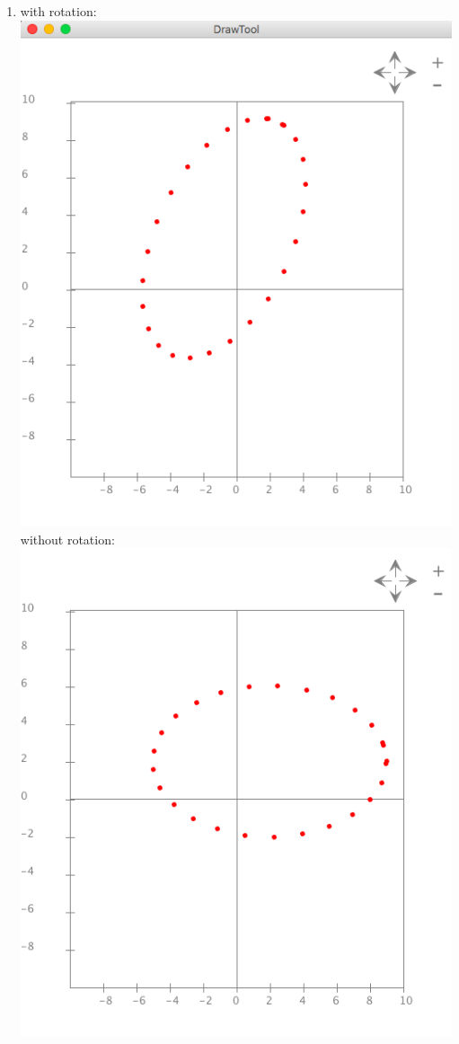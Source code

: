 \documentclass{article}
\begin{document}
\begin{enumerate}
\item with rotation:\\
\includegraphics[scale=0.3]{exercise23_with_rotation}\\
without rotation:\\
\includegraphics[scale=0.3]{exercise23_without_rotation}\\

\end{enumerate}
\end{document}
